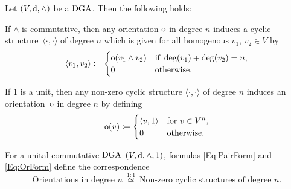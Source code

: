 \documentclass[\MainFolder/Text.tex]{subfiles}
\begin{document}
%
\begin{Proposition}\label{Prop:OrAndCyc}
Let $(V,\mathrm{d},\wedge)$ be a $\mathrm{DGA}$. Then the following holds:
\begin{ClaimList}
\item If $\wedge$ is commutative, then any orientation $\mathrm{o}$ in degree $n$ induces a cyclic structure~$\langle\cdot,\cdot\rangle$ of degree $n$ which is given for all homogenous $v_1$, $v_2\in V$ by
\begin{equation}\label{Eq:PairForm}
\langle v_1, v_2 \rangle \coloneqq \begin{cases}
    \mathrm{o}(v_1 \wedge v_2) & \text{if }\deg(v_1) + \deg(v_2) = n, \\
    0 & \text{otherwise}. \end{cases}
\end{equation}
\item If $1$ is a unit, then any non-zero cyclic structure $\langle\cdot,\cdot\rangle$ of degree $n$ induces an orientation~$\mathrm{o}$ in degree $n$ by defining 
\begin{equation}\label{Eq:OrForm}
\mathrm{o}(v) \coloneqq \begin{cases}
 \langle v, 1 \rangle & \text{for }v\in V^n,\\
 0 & \text{otherwise.}
 \end{cases}
\end{equation}
\item For a unital commutative $\mathrm{DGA}$ $(V,\mathrm{d},\wedge,1)$, formulas \eqref{Eq:PairForm} and \eqref{Eq:OrForm} define the correspondence
\[ \text{Orientations in degree }n\ \overset{1:1}{\simeq}\ \text{Non-zero cyclic structures of degree }n.\]
\end{ClaimList}
\end{Proposition}
\end{document}

